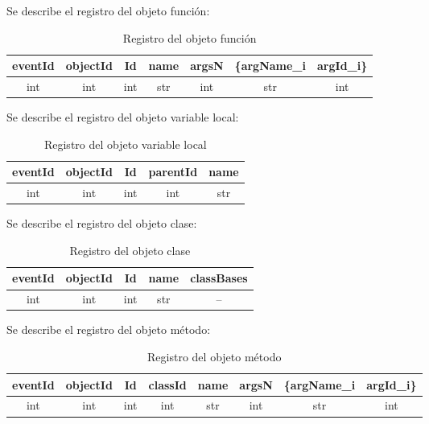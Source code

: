 \documentclass[10pt,a4paper]{article}
\begin{document}
Se describe el registro del objeto función:\\

\begin{table}[!h]
\begin{center}
\begin{tabular}{| c | c | c | c | c | c | c |}
\hline
eventId & objectId & Id & name & argsN & \{argName_{i} & argId_{i}\}\\
\hline
int & int & int & str & int & str & int \\
\hline
\end{tabular}
\caption{Registro del objeto función} 
\end{center}
\end{table}


Se describe el registro del objeto variable local:\\

\begin{table}[!h]
\begin{center}
\begin{tabular}{| c | c | c | c | c |}
\hline
eventId & objectId & Id & parentId & name\\
\hline
int & int & int & int & str\\
\hline
\end{tabular}
\caption{Registro del objeto variable local} 
\end{center}
\end{table}


Se describe el registro del objeto clase:\\

\begin{table}[!h]
\begin{center}
\begin{tabular}{| c | c | c | c | c |}
\hline
eventId & objectId & Id & name & classBases\\
\hline
int & int & int & str & --\footnotemark[1]\\
\hline
\end{tabular}
\caption{Registro del objeto clase} 
\end{center}
\end{table}


\newpage
Se describe el registro del objeto método:\\

\begin{table}[!h]
\begin{center}
\begin{tabular}{| c | c | c | c | c | c | c | c |}
\hline
eventId & objectId & Id & classId & name & argsN & \{argName_{i} & argId_{i}\}\\
\hline
int & int & int & int & str & int & str & int \\
\hline
\end{tabular}
\caption{Registro del objeto método} 
\end{center}
\end{table}
\end{document}

